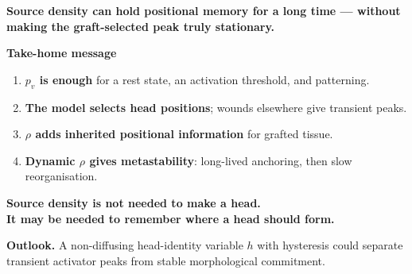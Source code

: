 \documentclass{article}
\newlength{\secgap}\setlength{\secgap}{1.1cm}
\newcommand{\claim}[1]{%
  \begin{tcolorbox}[enhanced,colback=CopperPale,colframe=Copper,boxrule=1.4pt,arc=3mm,
                    left=7mm,right=7mm,top=4mm,bottom=4mm,before skip=0.45cm,after skip=0.1cm]
  \fontsize{26}{32}\selectfont\bfseries\color{Petrol}#1
  \end{tcolorbox}%
}
\begin{document}
\claim{Source density can hold positional memory for a long time --- without making the graft-selected peak truly stationary.}

\vspace{\secgap}
\begin{tcolorbox}[enhanced,colback=PetrolDeep,colframe=PetrolDeep,arc=3mm,
                  left=1.2cm,right=1.2cm,top=0.6cm,bottom=0.6cm,before skip=0pt]
\color{white}
\begin{minipage}[t]{0.52\linewidth}
  {\fontsize{34}{38}\selectfont\bfseries\color{Copper}Take-home message\par}
  \vspace{0.25cm}
  \fontsize{22}{28}\selectfont
  \begin{enumerate}[leftmargin=1.3em,itemsep=0.35em,topsep=0pt]
    \item \textbf{$p_v$ is enough} for a rest state, an activation threshold, and patterning.
    \item \textbf{The model selects head positions}; wounds elsewhere give transient peaks.
    \item \textbf{$\rho$ adds inherited positional information} for grafted tissue.
    \item \textbf{Dynamic $\rho$ gives metastability}: long-lived anchoring, then slow reorganisation.
  \end{enumerate}
\end{minipage}\hfill
\begin{minipage}[t]{0.42\linewidth}
  \vspace{0.3cm}
  {\fontsize{32}{40}\selectfont\bfseries
  Source density is not needed to make a head.\\
  \textcolor{Copper}{It may be needed to remember where a head should form.}\par}
  \vspace{0.5cm}
  {\fontsize{19}{24}\selectfont\color{white!80!PetrolDeep}
  \textbf{\color{white}Outlook.} A non-diffusing head-identity variable $h$
  with hysteresis could separate transient activator peaks from stable
  morphological commitment.\par}
\end{minipage}
\end{tcolorbox}
\end{document}
